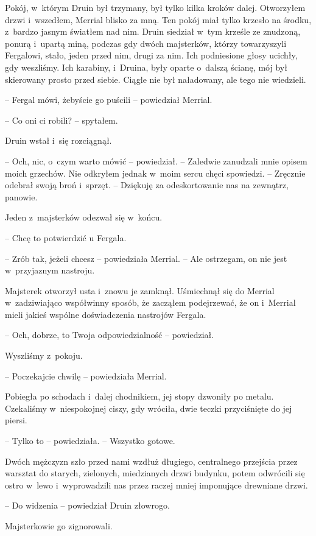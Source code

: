 \documentclass[oneside,polish,11pt,sfheadings]{mwbk}
\begin{document}
Pokój, w~którym Druin był trzymany, był tylko kilka kroków dalej.
Otworzyłem drzwi i~wszedłem, Merrial blisko za mną. Ten pokój miał tylko
krzesło na środku, z~bardzo jasnym światłem nad nim. Druin siedział w~tym krześle ze znudzoną, ponurą i~upartą miną, podczas gdy dwóch
majsterków, którzy towarzyszyli Fergalowi, stało, jeden przed nim, drugi
za nim. Ich podniesione głosy ucichły, gdy weszliśmy. Ich karabiny, i~Druina, były oparte o~dalszą ścianę, mój był skierowany prosto przed
siebie. Ciągle nie był naładowany, ale tego nie wiedzieli.

-- Fergal mówi, żebyście go puścili -- powiedział Merrial.

-- Co oni ci robili? -- spytałem.

Druin wstał i~się rozciągnął. 

-- Och, nic, o~czym warto mówić -- powiedział. -- Zaledwie zanudzali mnie opisem moich grzechów. Nie
odkryłem jednak w~moim sercu chęci spowiedzi. -- Zręcznie odebrał swoją
broń i~sprzęt. -- Dziękuję za odeskortowanie nas na zewnątrz, panowie.

Jeden z~majsterków odezwał się w~końcu. 

-- Chcę to potwierdzić u Fergala.

-- Zrób tak, jeżeli chcesz -- powiedziała Merrial. -- Ale ostrzegam, on nie
jest w~przyjaznym nastroju.

Majsterek otworzył usta i~znowu je zamknął. Uśmiechnął się do Merrial w~zadziwiająco współwinny sposób, że zacząłem podejrzewać, że on i~Merrial
mieli jakieś wspólne doświadczenia nastrojów Fergala. 

-- Och, dobrze, to
Twoja odpowiedzialność -- powiedział.

Wyszliśmy z~pokoju.

-- Poczekajcie chwilę -- powiedziała Merrial.

Pobiegła po schodach i~dalej chodnikiem, jej stopy dzwoniły po metalu.
Czekaliśmy w~niespokojnej ciszy, gdy wróciła, dwie teczki przyciśnięte
do jej piersi.

-- Tylko to -- powiedziała. -- Wszystko gotowe.

Dwóch mężczyzn szło przed nami wzdłuż długiego, centralnego przejścia
przez warsztat do starych, zielonych, miedzianych drzwi budynku, potem
odwrócili się ostro w~lewo i~wyprowadzili nas przez raczej mniej
imponujące drewniane drzwi.

-- Do widzenia -- powiedział Druin złowrogo.

Majsterkowie go zignorowali.
\end{document}
